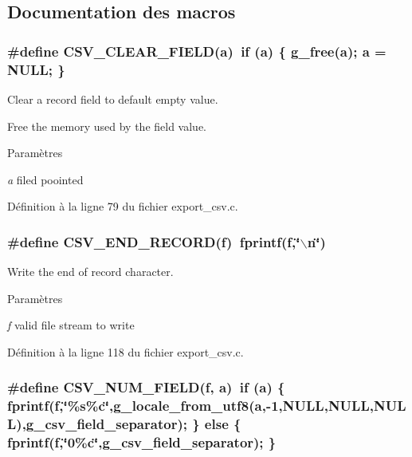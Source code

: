 \subsection{Documentation des macros}
\subsubsection[{CSV\_\-CLEAR\_\-FIELD}]{\setlength{\rightskip}{0pt plus 5cm}\#define CSV\_\-CLEAR\_\-FIELD(a)~if (a) \{ g\_\-free(a);  a = NULL; \}}\label{export__csv_8c_a8fb425b2e5f963da3390a8f5cf669e15}


Clear a record field to default empty value. 

Free the memory used by the field value.


\begin{DoxyParams}{Paramètres}
\item[{\em a}]filed poointed \end{DoxyParams}


Définition à la ligne 79 du fichier export\_\-csv.c.

\subsubsection[{CSV\_\-END\_\-RECORD}]{\setlength{\rightskip}{0pt plus 5cm}\#define CSV\_\-END\_\-RECORD(f)~fprintf(f,\char`\"{}$\backslash$n\char`\"{})}\label{export__csv_8c_a006c543a07e761c81b7a0865be4870c8}


Write the end of record character. 


\begin{DoxyParams}{Paramètres}
\item[{\em f}]valid file stream to write \end{DoxyParams}


Définition à la ligne 118 du fichier export\_\-csv.c.

\subsubsection[{CSV\_\-NUM\_\-FIELD}]{\setlength{\rightskip}{0pt plus 5cm}\#define CSV\_\-NUM\_\-FIELD(f, \/  a)~if (a) \{ fprintf(f,\char`\"{}\%s\%c\char`\"{},g\_\-locale\_\-from\_\-utf8(a,-\/1,NULL,NULL,NULL),g\_\-csv\_\-field\_\-separator); \} else \{ fprintf(f,\char`\"{}0\%c\char`\"{},g\_\-csv\_\-field\_\-separator); \}}\label{export__csv_8c_accc7abbe8de012b6f6f17c27cbb0d5bc}


